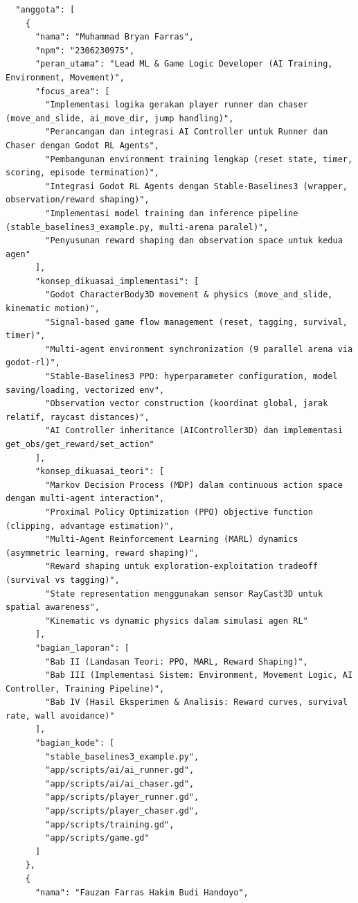 \documentclass[12pt,a4paper]{article}
\begin{document}
\begin{verbatim}
  "anggota": [
    {
      "nama": "Muhammad Bryan Farras",
      "npm": "2306230975",
      "peran_utama": "Lead ML & Game Logic Developer (AI Training, Environment, Movement)",
      "focus_area": [
        "Implementasi logika gerakan player runner dan chaser (move_and_slide, ai_move_dir, jump handling)",
        "Perancangan dan integrasi AI Controller untuk Runner dan Chaser dengan Godot RL Agents",
        "Pembangunan environment training lengkap (reset state, timer, scoring, episode termination)",
        "Integrasi Godot RL Agents dengan Stable-Baselines3 (wrapper, observation/reward shaping)",
        "Implementasi model training dan inference pipeline (stable_baselines3_example.py, multi-arena paralel)",
        "Penyusunan reward shaping dan observation space untuk kedua agen"
      ],
      "konsep_dikuasai_implementasi": [
        "Godot CharacterBody3D movement & physics (move_and_slide, kinematic motion)",
        "Signal-based game flow management (reset, tagging, survival, timer)",
        "Multi-agent environment synchronization (9 parallel arena via godot-rl)",
        "Stable-Baselines3 PPO: hyperparameter configuration, model saving/loading, vectorized env",
        "Observation vector construction (koordinat global, jarak relatif, raycast distances)",
        "AI Controller inheritance (AIController3D) dan implementasi get_obs/get_reward/set_action"
      ],
      "konsep_dikuasai_teori": [
        "Markov Decision Process (MDP) dalam continuous action space dengan multi-agent interaction",
        "Proximal Policy Optimization (PPO) objective function (clipping, advantage estimation)",
        "Multi-Agent Reinforcement Learning (MARL) dynamics (asymmetric learning, reward shaping)",
        "Reward shaping untuk exploration-exploitation tradeoff (survival vs tagging)",
        "State representation menggunakan sensor RayCast3D untuk spatial awareness",
        "Kinematic vs dynamic physics dalam simulasi agen RL"
      ],
      "bagian_laporan": [
        "Bab II (Landasan Teori: PPO, MARL, Reward Shaping)",
        "Bab III (Implementasi Sistem: Environment, Movement Logic, AI Controller, Training Pipeline)",
        "Bab IV (Hasil Eksperimen & Analisis: Reward curves, survival rate, wall avoidance)"
      ],
      "bagian_kode": [
        "stable_baselines3_example.py",
        "app/scripts/ai/ai_runner.gd",
        "app/scripts/ai/ai_chaser.gd",
        "app/scripts/player_runner.gd",
        "app/scripts/player_chaser.gd",
        "app/scripts/training.gd",
        "app/scripts/game.gd"
      ]
    },
    {
      "nama": "Fauzan Farras Hakim Budi Handoyo",

\end{verbatim}
\end{document}
